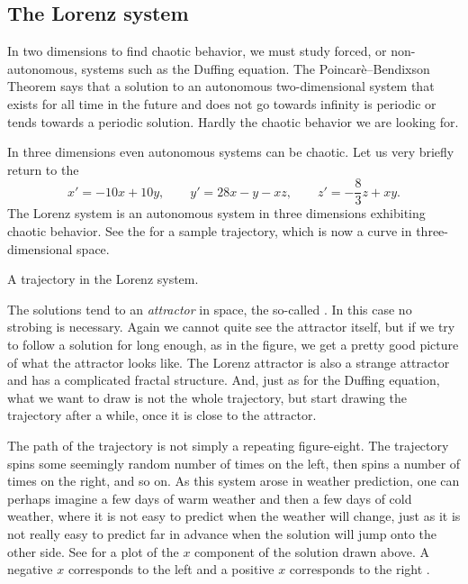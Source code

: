 \subsection{The Lorenz system}

In two dimensions to find chaotic behavior,
we must study forced, or non-autonomous, systems such as the Duffing
equation.
The Poincar\`e--Bendixson Theorem says that
a solution to an autonomous
two-dimensional system that exists for all time in the future
and does not go towards infinity
is periodic or tends towards a periodic solution.  Hardly the chaotic
behavior we are looking for.

In three dimensions even autonomous systems can be chaotic.
Let us very briefly return to the 
\begin{equation*}
x' = -10x +10y, \qquad y' = 28x-y-xz, \qquad z'=-\frac{8}{3}z + xy .
\end{equation*}
The Lorenz system is an autonomous system in three dimensions
exhibiting chaotic behavior.
See the  for a sample trajectory,
which is now a curve in three-dimensional space.
\begin{myfig}
\capstart
{}
\caption{A trajectory in the Lorenz system. \label{nlin:lorenz}}
\end{myfig}

The solutions tend to an \emph{attractor} in space,
the so-called \emph{}.
In this case no strobing is
necessary.
Again we cannot quite see the attractor itself, but if we try to follow a solution
for long enough, as in the figure,
we get a pretty good picture of what the attractor looks
like.
The Lorenz attractor is also a strange attractor and has a complicated
fractal structure.  And, just as for the Duffing equation, what we want to
draw is not the whole trajectory, but start drawing the trajectory after a
while, once it is close to the attractor.

The path of the trajectory is not simply a repeating figure-eight.
The trajectory spins some
seemingly random number of times on the left, then spins a number of times on
the right, and so on.  As this system arose in weather prediction, one can
perhaps imagine a few days of warm weather and then a few days of cold
weather, where it is not easy to predict when the weather will change,
just as it is not really easy to predict far in advance when the solution
will jump onto the other side.  See  for a
plot of the $x$ component of the solution drawn above.  A negative $x$
corresponds to the left  and a positive $x$
corresponds to the right .

